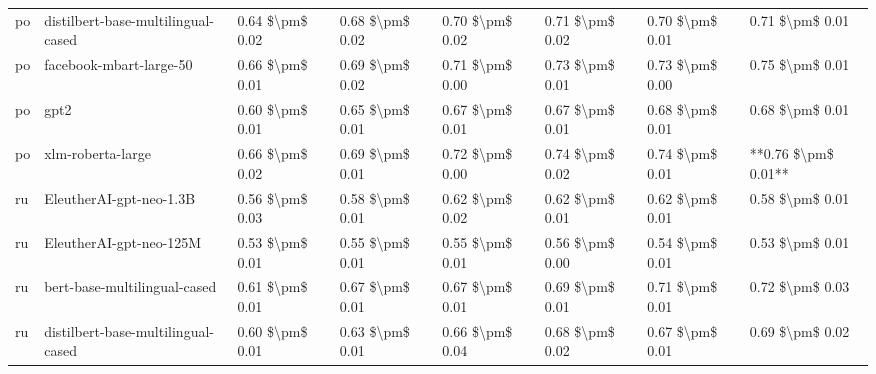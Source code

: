 \begin{tabular}{llllllll}
      po & distilbert-base-multilingual-cased & 0.64 \$\textbackslash pm\$ 0.02 &           0.68 \$\textbackslash pm\$ 0.02 &       0.70 \$\textbackslash pm\$ 0.02 &        0.71 \$\textbackslash pm\$ 0.02 &                         0.70 \$\textbackslash pm\$ 0.01 &     0.71 \$\textbackslash pm\$ 0.01 \\
      po &            facebook-mbart-large-50 & 0.66 \$\textbackslash pm\$ 0.01 &           0.69 \$\textbackslash pm\$ 0.02 &       0.71 \$\textbackslash pm\$ 0.00 &        0.73 \$\textbackslash pm\$ 0.01 &                         0.73 \$\textbackslash pm\$ 0.00 &     0.75 \$\textbackslash pm\$ 0.01 \\
      po &                               gpt2 & 0.60 \$\textbackslash pm\$ 0.01 &           0.65 \$\textbackslash pm\$ 0.01 &       0.67 \$\textbackslash pm\$ 0.01 &        0.67 \$\textbackslash pm\$ 0.01 &                         0.68 \$\textbackslash pm\$ 0.01 &     0.68 \$\textbackslash pm\$ 0.01 \\
      po &                  xlm-roberta-large & 0.66 \$\textbackslash pm\$ 0.02 &           0.69 \$\textbackslash pm\$ 0.01 &       0.72 \$\textbackslash pm\$ 0.00 &        0.74 \$\textbackslash pm\$ 0.02 &                         0.74 \$\textbackslash pm\$ 0.01 & **0.76 \$\textbackslash pm\$ 0.01** \\
      ru &            EleutherAI-gpt-neo-1.3B & 0.56 \$\textbackslash pm\$ 0.03 &           0.58 \$\textbackslash pm\$ 0.01 &       0.62 \$\textbackslash pm\$ 0.02 &        0.62 \$\textbackslash pm\$ 0.01 &                         0.62 \$\textbackslash pm\$ 0.01 &     0.58 \$\textbackslash pm\$ 0.01 \\
      ru &            EleutherAI-gpt-neo-125M & 0.53 \$\textbackslash pm\$ 0.01 &           0.55 \$\textbackslash pm\$ 0.01 &       0.55 \$\textbackslash pm\$ 0.01 &        0.56 \$\textbackslash pm\$ 0.00 &                         0.54 \$\textbackslash pm\$ 0.01 &     0.53 \$\textbackslash pm\$ 0.01 \\
      ru &       bert-base-multilingual-cased & 0.61 \$\textbackslash pm\$ 0.01 &           0.67 \$\textbackslash pm\$ 0.01 &       0.67 \$\textbackslash pm\$ 0.01 &        0.69 \$\textbackslash pm\$ 0.01 &                         0.71 \$\textbackslash pm\$ 0.01 &     0.72 \$\textbackslash pm\$ 0.03 \\
      ru & distilbert-base-multilingual-cased & 0.60 \$\textbackslash pm\$ 0.01 &           0.63 \$\textbackslash pm\$ 0.01 &       0.66 \$\textbackslash pm\$ 0.04 &        0.68 \$\textbackslash pm\$ 0.02 &                         0.67 \$\textbackslash pm\$ 0.01 &     0.69 \$\textbackslash pm\$ 0.02 \\

\end{tabular}
